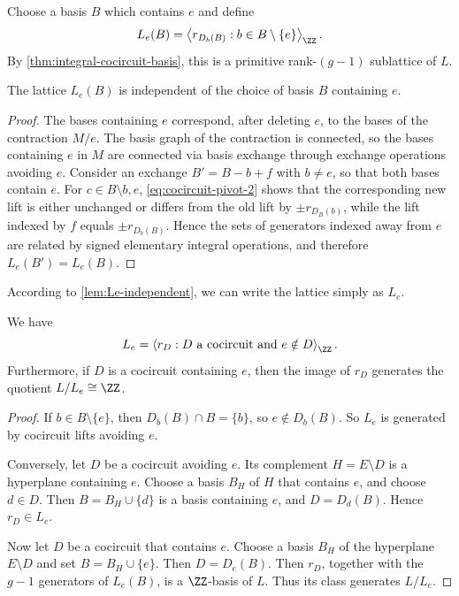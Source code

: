 \documentclass[11pt,letterpaper]{amsart}
\begin{document}
Choose a basis $B$ which contains $e$ and define
\begin{equation*}
  L_e(B)=
  \left\langle
  r_{D_b(B)}:b\in B\setminus\{e\}
  \right\rangle_{\ZZ}.
\end{equation*}
By \cref{thm:integral-cocircuit-basis}, this is a primitive rank-$(g-1)$ sublattice of $L$.

\begin{lemma}\label{lem:Le-independent}
The lattice $L_e(B)$ is independent of the choice of basis $B$ containing $e$.
\end{lemma}

\begin{proof}
The bases containing $e$ correspond, after deleting $e$, to the bases of the contraction $M/e$. The basis graph of the contraction is connected, so the bases containing $e$ in $M$ are connected via basis exchange through exchange operations avoiding $e$.  Consider an exchange $B'=B-b+f$
with $b\ne e$, so that both bases contain $e$. For $c\in B\setminus{b,e}$, \eqref{eq:cocircuit-pivot-2} shows that the corresponding new lift is either unchanged or differs from the old lift by $\pm r_{D_B(b)}$, while the lift indexed by $f$ equals $\pm r_{D_b(B)}.$ Hence the sets of generators indexed away from $e$ are related by signed elementary integral operations, and therefore $L_e(B')=L_e(B)$.
\end{proof}

According to \cref{lem:Le-independent}, we can write the lattice simply as $L_e$.

\begin{lemma}\label{lem:Le-cocircuit-description}
We have
\begin{equation*}
  L_e=\left\langle r_D:D\text{ a cocircuit and }e\notin D\right\rangle_{\ZZ}.
\end{equation*}
Furthermore, if $D$ is a cocircuit containing $e$, then the image of $r_D$ generates the quotient $L/L_e\cong\ZZ$.
\end{lemma}

\begin{proof}
If $b\in B\setminus\{e\}$, then $D_b(B)\cap B=\{b\}$, so $e\notin D_b(B)$. So $L_e$ is generated by cocircuit lifts avoiding $e$.

Conversely, let $D$ be a cocircuit avoiding $e$.  Its complement $H=E\setminus D$ is a hyperplane containing $e$.  Choose a basis $B_H$ of $H$ that contains $e$, and choose $d\in D$.  Then $B=B_H\cup\{d\}$ is a basis containing $e$, and $D=D_d(B)$.  Hence $r_D\in L_e$.

Now let $D$ be a cocircuit that contains $e$.  Choose a basis $B_H$ of the hyperplane $E\setminus D$ and set $B=B_H\cup\{e\}$.  Then $D=D_e(B)$.  Then $r_D$, together with the $g-1$ generators of $L_e(B)$, is a $\ZZ$-basis of $L$.  Thus its class generates $L/L_e$.
\end{proof}
\end{document}
